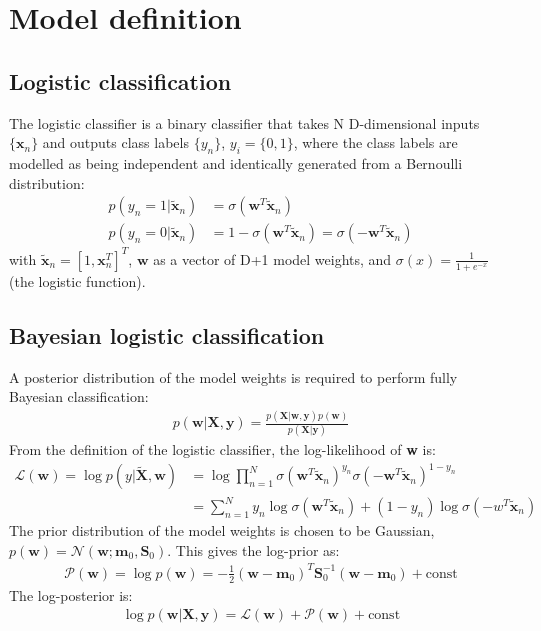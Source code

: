 \documentclass[a4paper]{article}
\begin{document}
    \section{Model definition}\label{sec:model-definition}
    \subsection{Logistic classification}
    The logistic classifier is a binary classifier that takes N D-dimensional inputs $\{\bm{x}_n\}$ and outputs class labels $\{y_n\}$, $y_i = \{0, 1\}$, where the class labels are modelled as being independent and identically generated from a Bernoulli distribution:
    \begin{align}
        p(y_n = 1 | \tilde{\bm{x}}_n) &= \sigma (\bm{w}^T\tilde{\bm{x}}_n) \nonumber \\
        p(y_n = 0 | \tilde{\bm{x}}_n) &= 1 - \sigma (\bm{w}^T\tilde{\bm{x}}_n) = \sigma (-\bm{w}^T\tilde{\bm{x}}_n)
        \label{eq:logistic-classifier}
    \end{align}
    with $\tilde{\bm{x}}_n = \left[1, \bm{x}_n^T \right]^T$, $\bm{w}$ as a vector of D+1 model weights, and $\sigma(x) = \frac{1}{1 + e^{-x}}$ (the logistic function).

    \subsection{Bayesian logistic classification}
    A posterior distribution of the model weights is required to perform fully Bayesian classification:
    \begin{align}
        p(\bm{w} | \bm{X}, \bm{y}) = \frac{p(\bm{X} | \bm{w}, \bm{y}) p(\bm w)}{p(\bm{X} | \bm{y})}
        \label{eq:posterior}
    \end{align}
    From the definition of the logistic classifier, the log-likelihood of \textbf{w} is:
    \begin{align}
        \mathcal{L}(\bm{w}) = \log p(y|\tilde{\bm{X}}, \bm{w})
        &= \log \prod_{n=1}^{N} \sigma( \bm{w}^T \tilde{\bm{x}}_n)^{y_n}
        \sigma (-\bm{w}^T \tilde{\bm{x}}_n)^{1-y_n} \nonumber \\
        &= \sum_{n=1}^{N} y_n \log\sigma( \bm{w}^T \tilde{\bm{x}}_n) + (1-y_n) \log\sigma(-w^T \tilde{\bm{x}}_n)
        \label{eq:log-likelihood}
    \end{align}
    The prior distribution of the model weights is chosen to be Gaussian, $p(\bm{w}) = \mathcal{N}(\bm{w}; \bm{m}_0, \bm{S}_0)$.
    This gives the log-prior as:
    \begin{align}
        \mathcal{P}(\bm{w}) = \log p(\bm{w}) = -\frac{1}{2}(\bm{w} - \bm{m}_0)^T \bm{S}_0^{-1} (\bm{w} - \bm{m}_0) + \text{const}
        \label{eq:log-prior}
    \end{align}
    The log-posterior is:
    \begin{align}
        \log p(\bm{w} | \bm{X}, \bm{y}) = \mathcal{L}(\bm{w}) + \mathcal{P}(\bm{w}) + \text{const}
        \label{eq:log-posterior}
    \end{align}
\end{document}
